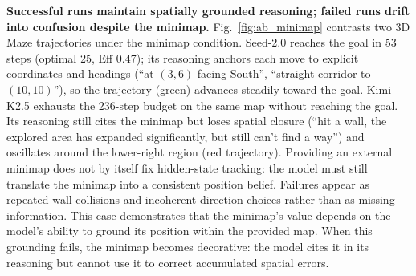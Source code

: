 \noindent\textbf{Successful runs maintain spatially grounded reasoning; failed runs drift into confusion despite the minimap.}\label{sec:appendix_viz_minimap}
Fig.~\ref{fig:ab_minimap} contrasts two 3D Maze trajectories under the minimap condition. Seed-2.0 reaches the goal in 53 steps (optimal 25, Eff 0.47); its reasoning anchors each move to explicit coordinates and headings (``at $(3,6)$ facing South'', ``straight corridor to $(10,10)$''), so the trajectory (green) advances steadily toward the goal. Kimi-K2.5 exhausts the 236-step budget on the same map without reaching the goal. Its reasoning still cites the minimap but loses spatial closure (``hit a wall, the explored area has expanded significantly, but still can't find a way'') and oscillates around the lower-right region (red trajectory). Providing an external minimap does not by itself fix hidden-state tracking: the model must still translate the minimap into a consistent position belief. Failures appear as repeated wall collisions and incoherent direction choices rather than as missing information. This case demonstrates that the minimap's value depends on the model's ability to ground its position within the provided map. When this grounding fails, the minimap becomes decorative: the model cites it in its reasoning but cannot use it to correct accumulated spatial errors.

